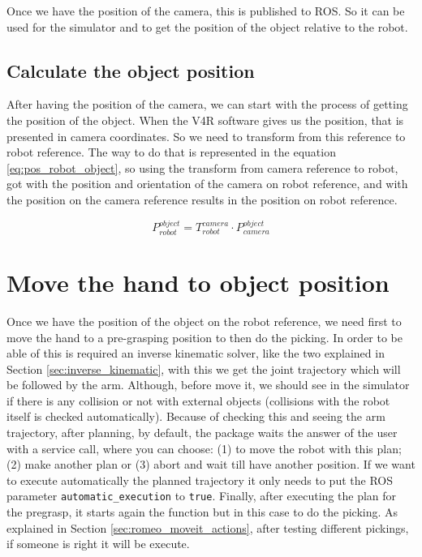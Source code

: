 \documentclass[12pt,a4paper,final,twoside,openright]{report}
\begin{document}
Once we have the position of the camera, this is published to ROS. So it can be used for the simulator and to get the position of the object relative to the robot.

\vspace{-10pt}
\subsection{Calculate the object position}
\label{sec:design_object_position}

After having the position of the camera, we can start with the process of getting the position of the object. When the V4R software gives us the position, that is presented in camera coordinates. So we need to transform from this reference to robot reference. The way to do that is represented in the equation \eqref{eq:pos_robot_object}, so using the transform from camera reference to robot, got with the position and orientation of the camera on robot reference, and with the position on the camera reference results in the position on robot reference.

\begin{equation}
P_{robot}^{object} = T_{robot}^{camera} \cdot P_{camera}^{object} \label{eq:pos_robot_object}
\end{equation}


\section{Move the hand to object position}
\label{sec:design_move_hand}

Once we have the position of the object on the robot reference, we need first to move the hand to a pre-grasping position to then do the picking. In order to be able of this is required an inverse kinematic solver, like the two explained in Section \ref{sec:inverse_kinematic}, with this we get the joint trajectory which will be followed by the arm. Although, before move it, we should see in the simulator if there is any collision or not with external objects (collisions with the robot itself is checked automatically). Because of checking this and seeing the arm trajectory, after planning, by default, the package waits  the answer of the user with a service call, where you can choose: (1) to move the robot with this plan; (2) make another plan or (3) abort and wait till have another position. If we want to execute automatically the planned trajectory it only needs to put the ROS parameter \texttt{automatic\_execution} to \texttt{true}. Finally, after executing the plan for the pregrasp, it starts again the function but in this case to do the picking. As explained in Section \ref{sec:romeo_moveit_actions}, after testing different pickings, if someone is right it will be execute.
\end{document}
